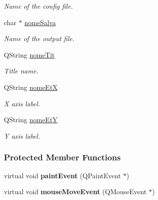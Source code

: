 \begin{DoxyCompactItemize}
\begin{DoxyCompactList}\small\item\em Name of the config file. \end{DoxyCompactList}\item 
char $\ast$ \hyperlink{classElementiGrafici_a516c32509a9d2ba2c9f7e53fcdbd9ce0}{nome\+Salva}\hypertarget{classElementiGrafici_a516c32509a9d2ba2c9f7e53fcdbd9ce0}{}\label{classElementiGrafici_a516c32509a9d2ba2c9f7e53fcdbd9ce0}

\begin{DoxyCompactList}\small\item\em Name of the output file. \end{DoxyCompactList}\item 
Q\+String \hyperlink{classElementiGrafici_a99be08b66bcb34c0eaed5636e717154e}{nome\+Tit}\hypertarget{classElementiGrafici_a99be08b66bcb34c0eaed5636e717154e}{}\label{classElementiGrafici_a99be08b66bcb34c0eaed5636e717154e}

\begin{DoxyCompactList}\small\item\em Title name. \end{DoxyCompactList}\item 
Q\+String \hyperlink{classElementiGrafici_a2237fc9b6764dc053b817d31bc133b3e}{nome\+EtX}\hypertarget{classElementiGrafici_a2237fc9b6764dc053b817d31bc133b3e}{}\label{classElementiGrafici_a2237fc9b6764dc053b817d31bc133b3e}

\begin{DoxyCompactList}\small\item\em X axis label. \end{DoxyCompactList}\item 
Q\+String \hyperlink{classElementiGrafici_a42f259c584d0d2e7aeb9967d149bd15e}{nome\+EtY}\hypertarget{classElementiGrafici_a42f259c584d0d2e7aeb9967d149bd15e}{}\label{classElementiGrafici_a42f259c584d0d2e7aeb9967d149bd15e}

\begin{DoxyCompactList}\small\item\em Y axis label. \end{DoxyCompactList}\end{DoxyCompactItemize}
\subsubsection*{Protected Member Functions}
\begin{DoxyCompactItemize}
\item 
virtual void {\bfseries paint\+Event} (Q\+Paint\+Event $\ast$)\hypertarget{classElementiGrafici_ad06d035e601c42cc2a3b9d1229c73d36}{}\label{classElementiGrafici_ad06d035e601c42cc2a3b9d1229c73d36}

\item 
virtual void {\bfseries mouse\+Move\+Event} (Q\+Mouse\+Event $\ast$)\hypertarget{classElementiGrafici_a88e672693c2cfdbaf9af942a58a8e1dd}{}\label{classElementiGrafici_a88e672693c2cfdbaf9af942a58a8e1dd}

\end{DoxyCompactItemize}



